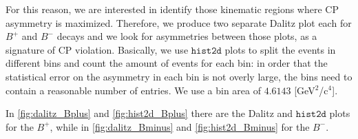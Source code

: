 For this reason, we are interested in identify those kinematic regions where CP asymmetry is maximized. Therefore, we produce two separate Dalitz plot each for $B^{+}$ and $B^{-}$ decays and we look for asymmetries between those plots, as a signature of CP violation.
Basically, we use $\texttt{hist2d}$ plots to split the events in different bins and count the amount of events for each bin: in order that the statistical error on the asymmetry in each bin is not overly large, the bins need to contain a reasonable number of entries. We use a bin area of $4.6143$ [GeV$^2$/c$^4$].

In \autoref{fig:dalitz_Bplus} and \autoref{fig:hist2d_Bplus} there are the Dalitz and $\texttt{hist2d}$ plots for the $B^{+}$, while in \autoref{fig:dalitz_Bminus} and \autoref{fig:hist2d_Bminus} for the $B^{-}$.  

